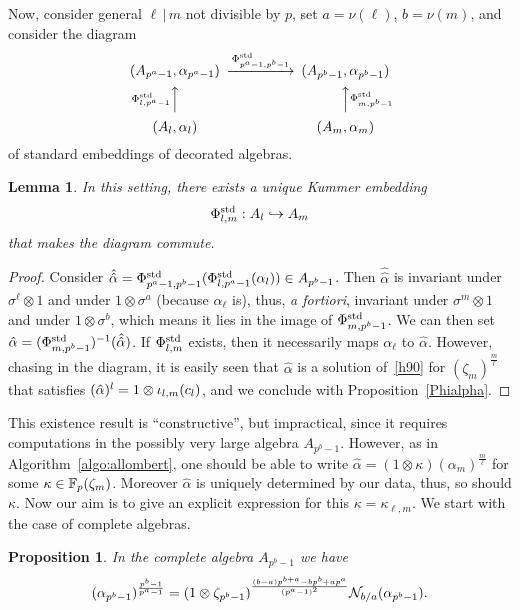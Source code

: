 \documentclass{sig-alternate}
\newtheorem{proposition}[theorem]{Proposition}
\newtheorem{lemma}[theorem]{Lemma}
\begin{document}
Now, consider general $\ell\,|\,m$ not divisible by $p$,
set $a=\nu(\ell)$, $b=\nu(m)$, and consider the diagram
\begin{equation*}
\label{3cotes}
\begin{CD}
(A_{p^a-1},\alpha_{p^a-1}) @>{\embedalg{p^a-1}{p^b-1}}>> (A_{p^b-1},\alpha_{p^b-1}) \\
@A{\embedalg{\ell}{p^a-1}}AA @AA{\embedalg{m}{p^b-1}}A\\
(A_\ell,\alpha_\ell) @. (A_m,\alpha_m)
\end{CD}
\end{equation*}
of standard embeddings of decorated algebras.
\begin{lemma}
In this setting, there exists a unique Kummer embedding
\[ {\Phi^{\mathrm{std}}_{{l},{m}}}:A_l\hookrightarrow A_m \]
that makes the diagram commute.
\end{lemma}
\begin{proof}
Consider $\hat{\hat\alpha}={\Phi^{\mathrm{std}}_{{p^a-1},{p^b-1}}}({\Phi^{\mathrm{std}}_{{l},{p^a-1}}}(\alpha_l))\in A_{p^b-1}$.
Then $\hat{\hat\alpha}$ is invariant under $\sigma^\ell\otimes1$ and
under $1\otimes\sigma^a$ (because $\alpha_\ell$ is),
thus, \textit{a fortiori}, invariant under $\sigma^m\otimes1$ and
under $1\otimes\sigma^b$, which means it lies in the image
of ${\Phi^{\mathrm{std}}_{{m},{p^b-1}}}$.
We can then set $\hat\alpha=({\Phi^{\mathrm{std}}_{{m},{p^b-1}}})^{-1}(\hat{\hat\alpha})$.
If ${\Phi^{\mathrm{std}}_{{l},{m}}}$ exists, then it necessarily maps $\alpha_\ell$
to $\hat\alpha$.
However, chasing in the diagram, it is easily seen that $\hat\alpha$ is
a solution of~\eqref{h90} for $(\zeta_m)^{\frac{m}{\ell}}$ that
satisfies $(\hat{\alpha})^l=1\otimes{\iota_{{l},{m}}}(c_l)$,
and we conclude with Proposition~\ref{Phialpha}.
\end{proof}
This existence result is ``constructive'', but impractical,
since it requires computations in the possibly very large algebra $A_{p^b-1}$.
However, as in Algorithm~\ref{algo:allombert}, one should be able
to write $\hat{\alpha}=(1\otimes\kappa)(\alpha_m)^{\frac{m}{\ell}}$
for some $\kappa\in\mathbb{F}_{p}(\zeta_m)$. Moreover $\hat{\alpha}$ is uniquely
determined by our data, thus, so should $\kappa$.
Now our aim is to give an explicit expression for this $\kappa=\kappa_{\ell,m}$.
We start with the case of complete algebras.
\begin{proposition}
\label{key}
In the complete algebra $A_{p^b-1}$ we have
\[ (\alpha_{p^b-1})^{\frac{p^b-1}{p^a-1}}=(1\otimes\zeta_{p^b-1})^{\frac{(b-a)p^{b+a}-bp^b+ap^a}{(p^a-1)^2}}\mathcal{N}_{b/a}(\alpha_{p^b-1}).\]
\end{proposition}
\end{document}
